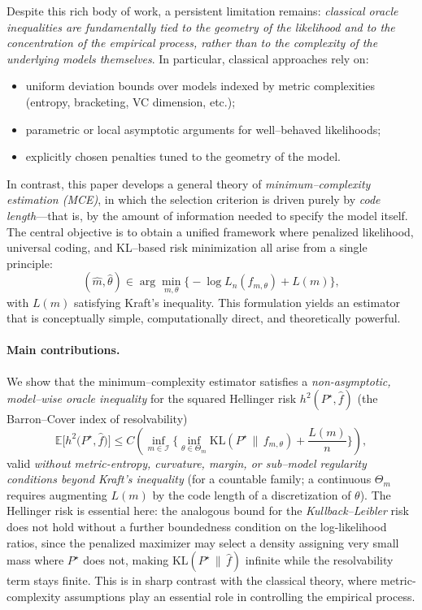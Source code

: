 \documentclass[12pt]{article}
\numberwithin{equation}{section}
\begin{document}
Despite this rich body of work, a persistent limitation remains:
\emph{classical oracle inequalities are fundamentally tied to the
	geometry of the likelihood and to the concentration of the empirical
	process, rather than to the complexity of the underlying models
	themselves}.  In particular, classical approaches rely on:
\begin{itemize}
	\item uniform deviation bounds over models indexed by metric
	complexities (entropy, bracketing, VC dimension, etc.);
	\item parametric or local asymptotic arguments for well–behaved
	likelihoods;
	\item explicitly chosen penalties tuned to the geometry of the model.
\end{itemize}

In contrast, this paper develops a general theory of
\emph{minimum–complexity estimation (MCE)}, in which the selection
criterion is driven purely by \emph{code length}––that is,
by the amount of information needed to specify the model itself.
The central objective is to obtain a unified framework where
penalized likelihood, universal coding, and KL–based risk minimization
all arise from a single principle:
\[
(\widehat{m},\widehat{\theta})
\in \arg\min_{m,\theta}
\Big\{-\log L_n(f_{m,\theta}) + L(m)\Big\},
\]
with $L(m)$ satisfying Kraft’s inequality.  
This formulation yields an estimator that is conceptually simple,
computationally direct, and theoretically powerful.

\paragraph{Main contributions.}
We show that the minimum–complexity estimator satisfies a
\emph{non-asymptotic, model–wise oracle inequality} for the squared
Hellinger risk $h^2(P^{\star},\widehat{f})$ (the Barron--Cover index of
resolvability)
\[
\mathbb{E}\Big[
h^2\!\big(P^{\star},\widehat{f}\big)
\Big]
\le
C\!\left(
\inf_{m\in\mathcal{I}}
\Big\{
\inf_{\theta\in\Theta_m}
\mathrm{KL}(P^{\star}\,\|\,f_{m,\theta})
+ \frac{L(m)}{n}
\Big\}
\right),
\]
valid \emph{without metric-entropy, curvature, margin, or sub–model
regularity conditions beyond Kraft's inequality} (for a countable family;
a continuous $\Theta_m$ requires augmenting $L(m)$ by the code length of a
discretization of $\theta$). The Hellinger risk is essential here: the
analogous bound for the \emph{Kullback--Leibler} risk does not hold without
a further boundedness condition on the log-likelihood ratios, since the
penalized maximizer may select a density assigning very small mass where
$P^\star$ does not, making $\mathrm{KL}(P^\star\,\|\,\widehat f)$ infinite
while the resolvability term stays finite.
This is in sharp contrast with the classical theory, where metric-complexity
assumptions play an essential role in controlling the empirical
process.
\end{document}
